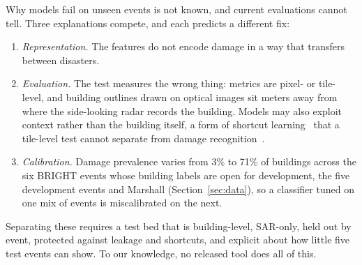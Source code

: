 \documentclass{ieeeaccess}
\begin{document}
Why models fail on unseen events is not known, and current evaluations cannot tell. Three explanations compete, and each predicts a different fix:
\begin{enumerate}
\item \emph{Representation.} The features do not encode damage in a way that transfers between disasters.
\item \emph{Evaluation.} The test measures the wrong thing: metrics are pixel- or tile-level, and building outlines drawn on optical images sit meters away from where the side-looking radar records the building. Models may also exploit context rather than the building itself, a form of shortcut learning~\cite{geirhos2020shortcut} that a tile-level test cannot separate from damage recognition~\cite{shibli2026shortcut}.
\item \emph{Calibration.} Damage prevalence varies from 3\% to 71\% of buildings across the six BRIGHT events whose building labels are open for development, the five development events and Marshall (Section~\ref{sec:data}), so a classifier tuned on one mix of events is miscalibrated on the next.
\end{enumerate}
Separating these requires a test bed that is building-level, SAR-only, held out by event, protected against leakage and shortcuts, and explicit about how little five test events can show. To our knowledge, no released tool does all of this.
\end{document}
